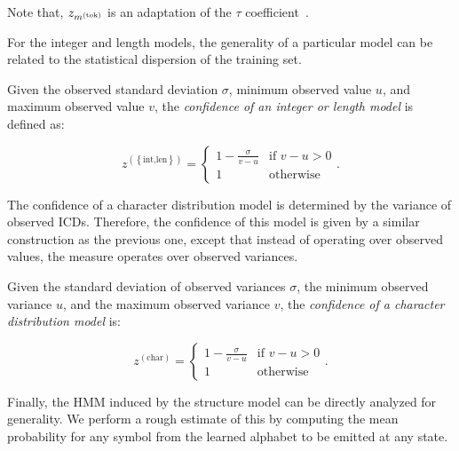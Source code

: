 Note that, $z_{m^{\left(\text{tok}\right)}}$ is an adaptation of the $\tau$ coefficient~\citep{kendalltau}.

For the integer and length models, the generality of a particular model can be related to the statistical dispersion of the training set.

\begin{definition}
  Given the observed standard deviation $\sigma$, minimum observed value $u$, and maximum observed value $v$, the \emph{confidence of an integer or length model} is defined as:

\begin{equation}
  z^{\left(\left\{\text{int,len}\right\}\right)}=
  \begin{cases}
    1-\frac{\sigma}{v-u} &\text{if } v-u>0 \\
    1 &\text{otherwise}
  \end{cases}.
\end{equation}
\end{definition}

The confidence of a character distribution model is determined by the variance of observed \acp{ICD}.  Therefore, the confidence of this model is given by a similar construction as the previous one, except that instead of operating over observed values, the measure operates over observed variances.

\begin{definition}
  Given the standard deviation of observed variances $\sigma$, the minimum observed variance $u$, and the maximum observed variance $v$, the \emph{confidence of a character distribution model} is:

\begin{equation}
  z^{\left(\text{char}\right)}=
  \begin{cases}
    1-\frac{\sigma}{v-u} &\text{if } v-u>0 \\
    1 &\text{otherwise}
  \end{cases}.
\end{equation}
\end{definition}

Finally, the \ac{HMM} induced by the structure model can be directly analyzed for generality.  We perform a rough estimate of this by computing the mean probability for any symbol from the learned alphabet to be emitted at any state.


